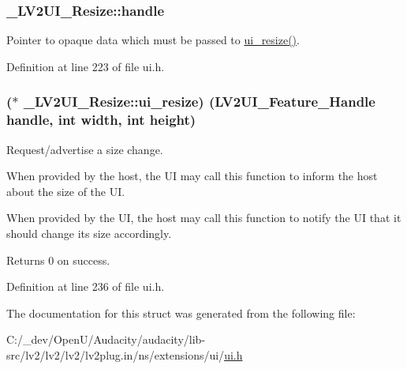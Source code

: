 \subsubsection[{\texorpdfstring{handle}{handle}}]{ \+\_\+\+L\+V2\+U\+I\+\_\+\+Resize\+::handle}\hypertarget{struct___l_v2_u_i___resize_ae2157e217898e362251e1fcd8f154203}{}\label{struct___l_v2_u_i___resize_ae2157e217898e362251e1fcd8f154203}
Pointer to opaque data which must be passed to \hyperlink{struct___l_v2_u_i___resize_abf3e744d681042f6504ff9e1e37da114}{ui\+\_\+resize()}. 

Definition at line 223 of file ui.\+h.

\subsubsection[{\texorpdfstring{ui\+\_\+resize}{ui_resize}}]{($\ast$ \+\_\+\+L\+V2\+U\+I\+\_\+\+Resize\+::ui\+\_\+resize) ({\bf L\+V2\+U\+I\+\_\+\+Feature\+\_\+\+Handle} {\bf handle}, {\bf int} width, {\bf int} height)}\hypertarget{struct___l_v2_u_i___resize_abf3e744d681042f6504ff9e1e37da114}{}\label{struct___l_v2_u_i___resize_abf3e744d681042f6504ff9e1e37da114}
Request/advertise a size change.

When provided by the host, the UI may call this function to inform the host about the size of the UI.

When provided by the UI, the host may call this function to notify the UI that it should change its size accordingly.

\begin{DoxyReturn}{Returns}
0 on success. 
\end{DoxyReturn}


Definition at line 236 of file ui.\+h.



The documentation for this struct was generated from the following file\+:\begin{DoxyCompactItemize}
\item 
C\+:/\+\_\+dev/\+Open\+U/\+Audacity/audacity/lib-\/src/lv2/lv2/lv2/lv2plug.\+in/ns/extensions/ui/\hyperlink{ui_8h}{ui.\+h}\end{DoxyCompactItemize}

